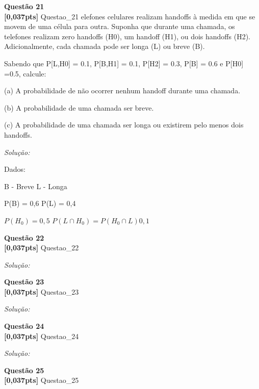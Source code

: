 \documentclass{article}
\newenvironment{problem}[2][Questão]
    { \begin{mdframed}[backgroundcolor=gray!20] \textbf{#1 #2} \\}
    {  \end{mdframed}}
\newenvironment{solution}
    {\textit{Solução:}}
    {}
\begin{document}
\begin{problem}{21}
\textbf{[0,037pts]} Questao\_21 elefones celulares realizam handoffs à medida em que se movem de uma célula para outra. 
Suponha que durante uma chamada, os telefones realizam zero handoffs (H0), um handoff (H1), ou dois handoffs (H2). Adicionalmente, cada chamada pode ser longa (L) ou breve (B). 

Sabendo que P[L,H0] = 0.1, P[B,H1] = 0.1, P[H2] = 0.3, P[B] = 0.6 e P[H0] =0.5, calcule: 

(a) A probabilidade de não ocorrer nenhum handoff durante uma chamada. 

(b) A probabilidade de uma chamada ser breve.

(c) A probabilidade de uma chamada ser longa ou existirem pelo menos dois handoffs.

\end{problem}

\begin{solution}

Dados:

B - Breve \newline
L - Longa

P(B) = 0,6
P(L) = 0,4

$P(H_{0}) = 0,5$
$P(L \cap H_{0}) = P(H_{0} \cap L) 0,1$
\end{solution}

\begin{problem}{22}
\textbf{[0,037pts]} Questao\_22
\end{problem}

\begin{solution}


\end{solution}

\begin{problem}{23}
\textbf{[0,037pts]} Questao\_23
\end{problem}

\begin{solution}


\end{solution}

\begin{problem}{24}
\textbf{[0,037pts]} Questao\_24
\end{problem}

\begin{solution}


\end{solution}

\begin{problem}{25}
\textbf{[0,037pts]} Questao\_25
\end{problem}
\end{document}

